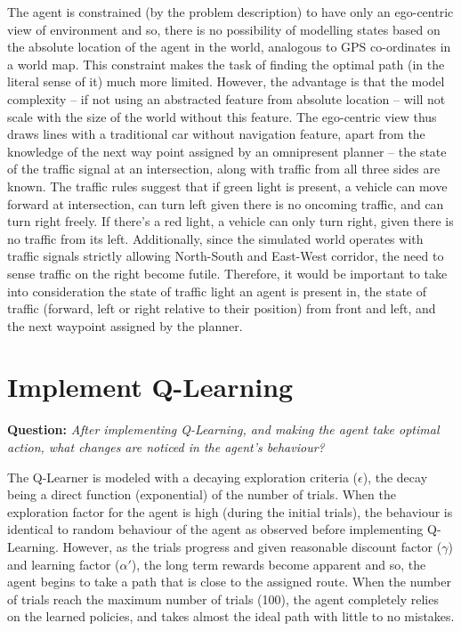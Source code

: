 \documentclass{article}
\begin{document}
	The agent is constrained (by the problem description) to have only an ego-centric view of environment and so, there is no possibility of modelling states based on the absolute location of the agent in the world, analogous to GPS co-ordinates in a world map. This constraint makes the task of finding the optimal path (in the literal sense of it) much more limited. However, the advantage is that the model complexity -- if not using an abstracted feature from absolute location -- will not scale with the size of the world without this feature. The ego-centric view thus draws lines with a traditional car without navigation feature, apart from the knowledge of the next way point assigned by an omnipresent planner -- the state of the traffic signal at an intersection, along with traffic from all three sides are known. The traffic rules suggest that if green light is present, a vehicle can move forward at intersection, can turn left given there is no oncoming traffic, and can turn right freely. If there's a red light, a vehicle can only turn right, given there is no traffic from its left. Additionally, since the simulated world operates with traffic signals strictly allowing North-South and East-West corridor, the need to sense traffic on the right become futile. Therefore, it would be important to take into consideration the state of traffic light an agent is present in, the state of traffic (forward, left or right relative to their position) from front and left, and the next waypoint assigned by the planner.
	
	\section{Implement Q-Learning}
	\textbf{Question:} \emph{After implementing Q-Learning, and making the agent take optimal action, what changes are noticed in the agent's behaviour?}
	
	The Q-Learner is modeled with a decaying exploration criteria ($\epsilon$), the decay being a direct function (exponential) of the number of trials. When the exploration factor for the agent is high (during the initial trials), the behaviour is identical to random behaviour of the agent as observed before implementing Q-Learning. However, as the trials progress and given reasonable discount factor ($\gamma$) and learning factor ($\alpha\prime$), the long term rewards become apparent and so, the agent begins to take a path that is close to the assigned route. When the number of trials reach the maximum number of trials (100), the agent completely relies on the learned policies, and takes almost the ideal path with little to no mistakes. 
\end{document}
